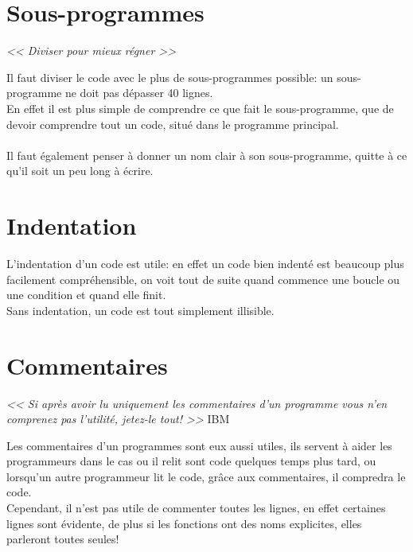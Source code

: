 \documentclass[12pt,a4paper,openany]{article}
\begin{document}
	\section{Sous-programmes}
		\begin{center}
		\large{\textit{<< Diviser pour mieux régner >>}}
		\end{center}
		Il faut diviser le code avec le plus de sous-programmes possible: un sous-programme ne doit pas
			dépasser 40 lignes. \\
		En effet il est plus simple de comprendre ce que fait le sous-programme, 
			que de devoir comprendre tout un code, situé dans le programme principal.\\ \\
		Il faut également penser à donner un nom clair à son sous-programme, quitte à ce qu'il soit
		un peu long à écrire.
	\section{Indentation}
		L'indentation d'un code est utile: en effet un code bien indenté est beaucoup plus facilement 
		compréhensible, on voit tout de suite quand commence une boucle ou une condition et quand elle
		finit. \\
		Sans indentation, un code est tout simplement illisible.  
	\section{Commentaires}
		\begin{center}
		\large{\textit{<< Si après avoir lu uniquement les commentaires 
			d'un programme vous n'en comprenez pas l'utilité, jetez-le tout! >>}} IBM
		\end{center}

		Les commentaires d'un programmes sont eux aussi utiles, ils servent à aider les programmeurs
		dans le cas ou il relit sont code quelques temps plus tard, ou lorsqu'un autre programmeur lit
		le code, grâce aux commentaires, il compredra le code.\\
		Cependant, il n'est pas utile de commenter toutes les lignes, en effet certaines lignes 
			sont évidente, de plus si les fonctions ont des noms explicites, elles parleront toutes seules! 
		\newpage	
			
			
\end{document}
